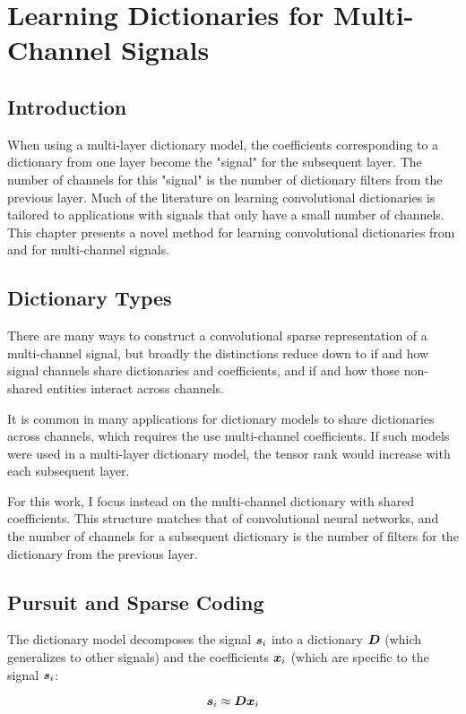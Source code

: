 \chapter{Learning Dictionaries for Multi-Channel Signals}

\section{Introduction}
When using a multi-layer dictionary model, the coefficients corresponding to a dictionary from one layer become the "signal" for the subsequent layer.  The number of channels for this "signal" is the number of dictionary filters from the previous layer.  Much of the literature on learning convolutional dictionaries is tailored to applications with signals that only have a small number of channels.  This chapter presents a novel method for learning convolutional dictionaries from and for multi-channel signals. 
\section{Dictionary Types}
There are many ways to construct a convolutional sparse representation of a multi-channel signal, but broadly the distinctions reduce down to if and how signal channels share dictionaries and coefficients, and if and how those non-shared entities interact across channels.

It is common in many applications for dictionary models to share dictionaries across channels, which requires the use multi-channel coefficients. If such models were used in a multi-layer dictionary model, the tensor rank would increase with each subsequent layer.

For this work, I focus instead on the multi-channel dictionary with shared coefficients. This structure matches that of convolutional neural networks, and the number of channels for a subsequent dictionary is the number of filters for the dictionary from the previous layer.
\section{Pursuit and Sparse Coding}
The dictionary model decomposes the signal $\bm{s}_i$ into a dictionary $\bm{D}$ (which generalizes to other signals) and the coefficients $\bm{x}_i$ (which are specific to the signal $\bm{s}_i$:

\begin{equation}
\bm{s}_i \approx \bm{D}\bm{x}_i
\end{equation}

